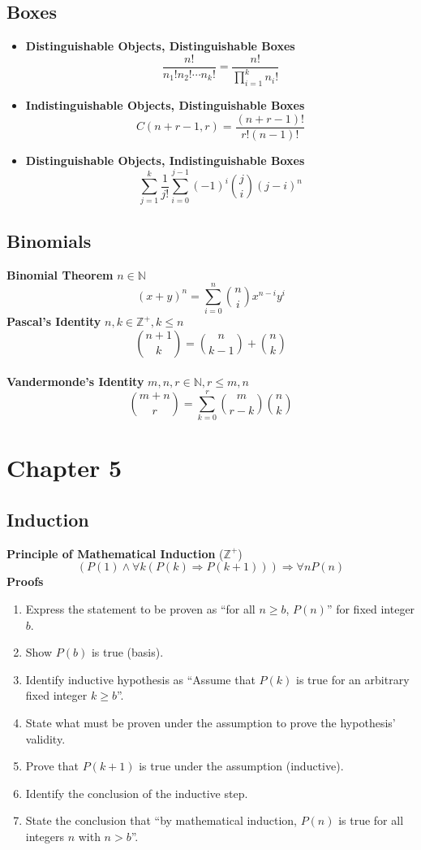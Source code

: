 \documentclass[12pt, A4, twocolumn]{article}
\newcommand{\N}{\mathbb{N}}
\newcommand{\Z}{\mathbb{Z}}
\begin{document}
		\subsection*{Boxes}
			\begin{itemize}
				\item
					\textbf{Distinguishable Objects, Distinguishable Boxes}
						\[\frac{n!}{n_1!n_2!\cdots n_k!} = \frac{n!}{\prod\limits_{i = 1}^k n_i!}\]
				\item
					\textbf{Indistinguishable Objects, Distinguishable Boxes}
						\[C(n + r - 1, r) = \frac{(n + r - 1)!}{r!(n - 1)!}\]
				\item
					\textbf{Distinguishable Objects, Indistinguishable Boxes}
						\[\sum_{j = 1}^k \frac{1}{j!} \sum_{i = 0}^{j - 1} (-1)^i\binom{j}{i}(j - i)^n\]
			\end{itemize}
		\subsection*{Binomials}
			\textbf{Binomial Theorem}
			\(n \in \N\)
				\[(x + y)^n = \sum_{i = 0}^n \binom{n}{i} x^{n - i}y^i\]
			\textbf{Pascal's Identity}
				\(n, k \in \Z^+, k \le n\)
				\[\binom{n + 1}{k} = \binom{n}{k - 1} + \binom{n}{k}\] \\
			\textbf{Vandermonde's Identity}
				\(m, n, r \in \N, r \le m, n\)
				\[\binom{m + n}{r} = \sum_{k = 0}^r \binom{m}{r - k}\binom{n}{k}\]
	\section*{Chapter 5}
		\subsection*{Induction}
			\textbf{Principle of Mathematical Induction} (\(\Z^+\))
				\[(P(1) \land \forall k(P(k) \Rightarrow P(k + 1))) \Rightarrow \forall n P(n)\]
			\textbf{Proofs}
				\begin{enumerate}
					\item
						Express the statement to be proven as \enquote{for all \(n \ge b\), \(P(n)\)} for fixed integer \(b\).
					\item
						Show \(P(b)\) is true (basis).
					\item
						Identify inductive hypothesis as \enquote{Assume that \(P(k)\) is true for an arbitrary fixed integer \(k \ge b\)}.
					\item
						State what must be proven under the assumption to prove the hypothesis' validity.
					\item
						Prove that \(P(k + 1)\) is true under the assumption (inductive).
					\item
						Identify the conclusion of the inductive step.
					\item
						State the conclusion that \enquote{by mathematical induction, \(P(n)\) is true for all integers \(n\) with \(n > b\)}.
				\end{enumerate}
\end{document}
